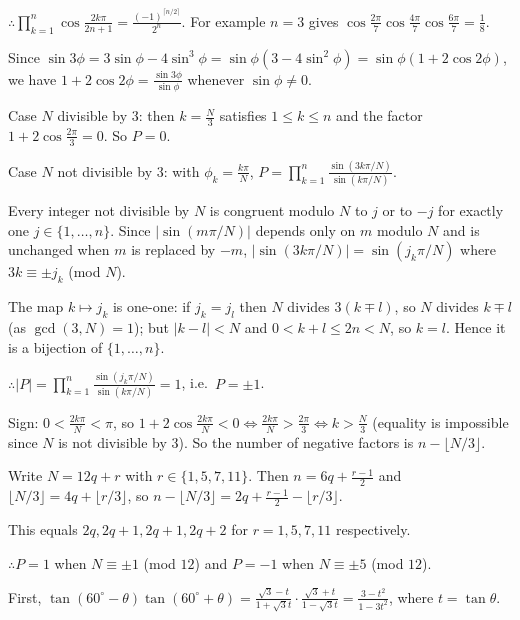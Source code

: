   $\therefore \displaystyle\prod_{k = 1}^{n}\cos\frac{2k\pi}{2n + 1} = \frac{(-1)^{\lceil n/2\rceil}}{2^n}$. For
  example $n = 3$ gives $\cos\frac{2\pi}{7}\cos\frac{4\pi}{7}\cos\frac{6\pi}{7} = \frac{1}{8}$.
\item Since $\sin3\phi = 3\sin\phi - 4\sin^3\phi = \sin\phi(3 - 4\sin^2\phi) = \sin\phi(1 + 2\cos2\phi)$, we
  have $1 + 2\cos2\phi = \frac{\sin3\phi}{\sin\phi}$ whenever $\sin\phi\neq 0$.

  Case $N$ divisible by $3$: then $k = \frac{N}{3}$ satisfies $1\leq k\leq n$ and the factor $1 + 2\cos\frac{2\pi}{3} = 0$.
  So $P = 0$.

  Case $N$ not divisible by $3$: with $\phi_k = \frac{k\pi}{N}$, $P = \displaystyle\prod_{k = 1}^{n}\frac{\sin(3k\pi/N)}{\sin(k\pi/N)}$.

  Every integer not divisible by $N$ is congruent modulo $N$ to $j$ or to $-j$ for exactly one $j\in\{1, \ldots,
  n\}$. Since $|\sin(m\pi/N)|$ depends only on $m$ modulo $N$ and is unchanged when $m$ is replaced by $-m$,
  $|\sin(3k\pi/N)| = \sin(j_k\pi/N)$ where $3k\equiv\pm j_k$ (mod $N$).

  The map $k\mapsto j_k$ is one-one: if $j_k = j_l$ then $N$ divides $3(k\mp l)$, so $N$ divides $k\mp l$ (as
  $\gcd(3, N) = 1$); but $|k - l| < N$ and $0 < k + l\leq 2n < N$, so $k = l$. Hence it is a bijection of $\{1,
  \ldots, n\}$.

  $\therefore |P| = \displaystyle\prod_{k = 1}^{n}\frac{\sin(j_k\pi/N)}{\sin(k\pi/N)} = 1$, i.e.\ $P = \pm 1$.

  Sign: $0 < \frac{2k\pi}{N} < \pi$, so $1 + 2\cos\frac{2k\pi}{N} < 0\iff\frac{2k\pi}{N} > \frac{2\pi}{3}\iff
  k > \frac{N}{3}$ (equality is impossible since $N$ is not divisible by $3$). So the number of negative factors is $n - \lfloor
  N/3\rfloor$.

  Write $N = 12q + r$ with $r\in\{1, 5, 7, 11\}$. Then $n = 6q + \frac{r - 1}{2}$ and $\lfloor N/3\rfloor = 4q
  + \lfloor r/3\rfloor$, so $n - \lfloor N/3\rfloor = 2q + \frac{r - 1}{2} - \lfloor r/3\rfloor$.

  This equals $2q, 2q + 1, 2q + 1, 2q + 2$ for $r = 1, 5, 7, 11$ respectively.

  $\therefore P = 1$ when $N\equiv\pm 1$ (mod $12$) and $P = -1$ when $N\equiv\pm 5$ (mod $12$).
\item First, $\tan(60^\circ - \theta)\tan(60^\circ + \theta) = \frac{\sqrt{3} - t}{1 + \sqrt{3}t}\cdot\frac{\sqrt{3}
    + t}{1 - \sqrt{3}t} = \frac{3 - t^2}{1 - 3t^2}$, where $t = \tan\theta$.

